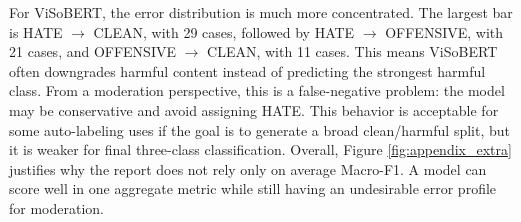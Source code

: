 \documentclass[journal]{IEEEtran}
\newcommand{\mf}{Macro-F1}
\begin{document}
For ViSoBERT, the error distribution is much more concentrated. The largest bar is HATE $\rightarrow$ CLEAN, with 29 cases, followed by HATE $\rightarrow$ OFFENSIVE, with 21 cases, and OFFENSIVE $\rightarrow$ CLEAN, with 11 cases. This means ViSoBERT often downgrades harmful content instead of predicting the strongest harmful class. From a moderation perspective, this is a false-negative problem: the model may be conservative and avoid assigning HATE. This behavior is acceptable for some auto-labeling uses if the goal is to generate a broad clean/harmful split, but it is weaker for final three-class classification. Overall, Figure \ref{fig:appendix_extra} justifies why the report does not rely only on average \mf{}. A model can score well in one aggregate metric while still having an undesirable error profile for moderation.

\clearpage
\end{document}
